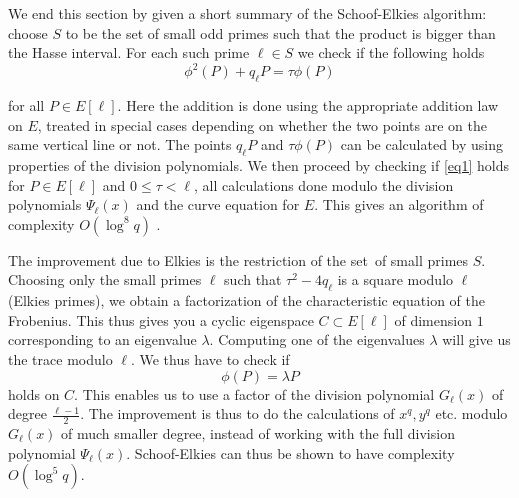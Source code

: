 We end this section by given a short summary of the Schoof-Elkies algorithm:
choose $S$ to be the set of small odd primes such that the product is bigger than the Hasse
interval. For each such prime $\ell \in S$ we check if the following holds
\begin{equation} \label{eq1}
 \phi^2(P) + q_\ell P = \tau \phi(P)
\end{equation}

for all $P\in E[\ell]$. Here the addition is done using the appropriate addition law on $E$,
treated in special cases depending on whether the two points are on the same vertical line
or not. The points $q_\ell P$ and $\tau \phi(P)$ can be calculated by using properties of
the division polynomials. We then proceed by checking if \eqref{eq1} holds for $P\in E[\ell]$ and
$ 0 \leq \tau < \ell$, all calculations done modulo the division polynomials $\Psi_\ell(x)$
and the curve equation for $E$. This gives an algorithm of complexity $O(\log^8 q)$ \cite{Schoof}.

The improvement due to Elkies is the restriction of the set of small primes $S$. Choosing
only the small primes $\ell$ such that $\tau^2 - 4q_\ell$ is a square modulo $\ell$ (Elkies primes),
we obtain a factorization of the characteristic equation of the Frobenius. This thus
gives you a cyclic eigenspace $C\subset E[\ell]$ of dimension $1$ corresponding to an eigenvalue
$\lambda$. Computing one of the eigenvalues $\lambda$ will give us the trace modulo $\ell$.
We thus have to check if
$$ \phi(P) = \lambda P$$
holds on $C$. This enables us to use a factor of the division polynomial $G_\ell(x)$ of degree
$\frac{\ell-1}{2}$. The improvement is thus to do the calculations of $x^q, y^q$ etc.
modulo $G_\ell(x)$ of much smaller degree, instead of working with the full division polynomial $\Psi_\ell(x)$.
Schoof-Elkies can thus be shown \cite{Schoof} to have complexity $O(\log^5 q)$.
